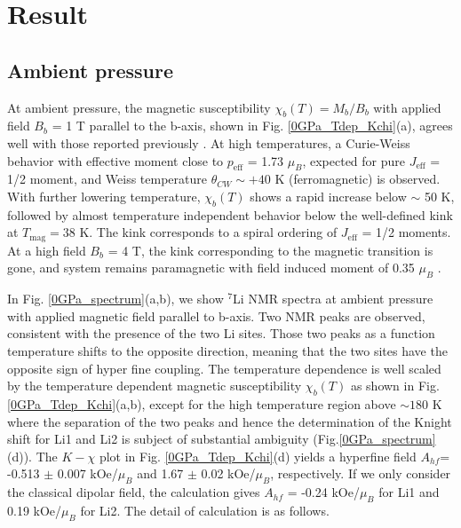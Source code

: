 \documentclass[a4,10.5pt]{report}
\begin{document}
\chapter{Result}
\label{result}
\section{Ambient pressure}
At ambient pressure, the magnetic susceptibility $\chi_b(T)=M_b/B_b$ with applied field $B_b$ = 1 T parallel to the b-axis, shown in Fig. \ref{0GPa_Tdep_Kchi}(a), 
agrees well with those reported previously \cite{takayama2015hyperhoneycomb}. 
At high temperatures, a Curie-Weiss behavior with effective moment close to $p_\mathrm{eff}$ = 1.73 $\mu_B$, expected for pure $J_\mathrm{eff}$ = 1/2 moment, 
and Weiss temperature $\theta_{CW} \sim +40$ K (ferromagnetic) is observed. 
With further lowering temperature, $\chi_b(T)$ shows a rapid increase below $\sim$ 50 K, 
followed by almost temperature independent behavior below the well-defined kink at $T_\mathrm{mag} = 38$ K. 
The kink corresponds to a spiral ordering of $J_\mathrm{eff}$ = 1/2 moments. 
At a high field $B_b$ = 4 T, the kink corresponding to the magnetic transition is gone, and system remains paramagnetic with field induced moment of 0.35 $\mu_B$ 
\cite{takayama2015hyperhoneycomb}.

In Fig. \ref{0GPa_spectrum}(a,b), we show ${}^7$Li NMR spectra at ambient pressure with applied magnetic field parallel to b-axis. 
Two NMR peaks are observed, consistent with the presence of the two Li sites. 
Those two peaks as a function temperature shifts to the opposite direction, meaning that the two sites have the opposite sign of hyper fine coupling. 
The temperature dependence is well scaled by the temperature dependent magnetic susceptibility $\chi_b(T)$ as shown in Fig. \ref{0GPa_Tdep_Kchi}(a,b), 
except for the high temperature region above $\sim 180$ K where the separation of the two peaks and hence the determination of the Knight shift for Li1 and Li2 
is subject of substantial ambiguity (Fig.\ref{0GPa_spectrum}(d)).
The $K-\chi$ plot in Fig. \ref{0GPa_Tdep_Kchi}(d) yields a hyperfine field $A_{hf}$= -0.513 $\pm$ 0.007 kOe/$\mu_B$ and 1.67 $\pm$ 0.02 kOe/$\mu_B$, respectively. 
If we only consider the classical dipolar field, the calculation gives $A_{hf}$ = -0.24 kOe/$\mu_B$ for Li1 and 0.19 kOe/$\mu_B$ for Li2.
The detail of calculation is as follows.
\end{document}
